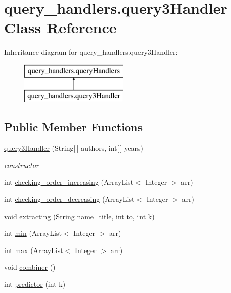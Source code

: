\hypertarget{classquery__handlers_1_1query3_handler}{}\section{query\+\_\+handlers.\+query3\+Handler Class Reference}
\label{classquery__handlers_1_1query3_handler}
Inheritance diagram for query\+\_\+handlers.\+query3\+Handler\+:\begin{figure}[H]
\begin{center}
\leavevmode
\includegraphics[height=2.000000cm]{classquery__handlers_1_1query3_handler}
\end{center}
\end{figure}
\subsection*{Public Member Functions}
\begin{DoxyCompactItemize}
\item 
\hyperlink{classquery__handlers_1_1query3_handler_a211f4f1f6cab6c6f5e8b6d94efea78d7}{query3\+Handler} (String\mbox{[}$\,$\mbox{]} authors, int\mbox{[}$\,$\mbox{]} years)
\begin{DoxyCompactList}\small\item\em constructor \end{DoxyCompactList}\item 
int \hyperlink{classquery__handlers_1_1query3_handler_acb3ae38f189ef5a87618a1593f8af8f7}{checking\+\_\+order\+\_\+increasing} (Array\+List$<$ Integer $>$ arr)
\item 
int \hyperlink{classquery__handlers_1_1query3_handler_a834ed632eac8da778268712379dc9276}{checking\+\_\+order\+\_\+decreasing} (Array\+List$<$ Integer $>$ arr)
\item 
void \hyperlink{classquery__handlers_1_1query3_handler_a4e7acaec3146f3b1d3a2bb5c1f0321ff}{extracting} (String name\+\_\+title, int to, int k)
\item 
int \hyperlink{classquery__handlers_1_1query3_handler_affac3098097a9d83c927eaaf740f34be}{min} (Array\+List$<$ Integer $>$ arr)
\item 
int \hyperlink{classquery__handlers_1_1query3_handler_a5181103ca3b1aa7d28d8309d23663ec0}{max} (Array\+List$<$ Integer $>$ arr)
\item 
void \hyperlink{classquery__handlers_1_1query3_handler_ab800b3c663fefa2cd2a0e156c062a591}{combiner} ()
\item 
int \hyperlink{classquery__handlers_1_1query3_handler_ad8ec9411686a311cbef00a5dd15fe72c}{predictor} (int k)
\end{DoxyCompactItemize}


